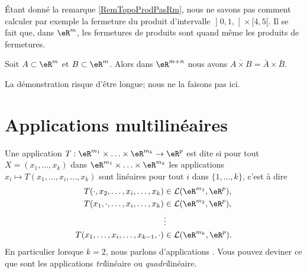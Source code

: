Étant donné la remarque \ref{RemTopoProdPasRm}, nous ne savons pas comment calculer par exemple la fermeture du produit d'intervalle $\mathopen] 0,1 ,  \mathclose[\times\mathopen[ 4 , 5 [$. Il se fait que, dans $\eR^m$, les fermetures de produits sont quand même les produits de fermetures.

\begin{proposition}		\label{PropovlAxBbarAbraB}
	Soit $A\subset\eR^m$ et $B\subset\eR^m$. Alors dans $\eR^{m+n}$ nous avons $\overline{ A\times B }=\bar A\times \bar B$.
\end{proposition}

La démonstration risque d'être longue; nous ne la faisons pas ici.

\section{Applications multilinéaires}

\begin{definition}       \label{DefFRHooKnPCT}
    Une application $T: \eR^{m_1}\times \ldots \times\eR^{m_k}\to\eR^p $ est dite  si pour tout $X=(x_1, \ldots,x_k)$ dans $ \eR^{m_1}\times \ldots \times\eR^{m_k}$ les applications $x_i\mapsto T(x_1, \ldots, x_i,\ldots,x_k)$ sont linéaires pour tout $i$ dans $\{1,\ldots,k\}$, c'est à dire
	\begin{equation}
		\begin{aligned}[]
			T(\cdot,x_2, \ldots, x_i,\ldots,x_k)&\in \mathcal{L}(\eR^{m_1}, \eR^p),\\
			T(x_1,\cdot, \ldots, x_i,\ldots,x_k)&\in \mathcal{L}(\eR^{m_2}, \eR^p),\\
						& \vdots\\
			T(x_1, \ldots, x_i,\ldots,x_{k-1},\cdot)&\in \mathcal{L}(\eR^{m_k}, \eR^p).\\
		\end{aligned}
	\end{equation}
	En particulier lorsque $k=2$, nous parlons d'applications . Vous pouvez deviner ce que sont les applications \emph{tri}linéaire ou \emph{quadri}linéaire.
\end{definition}

